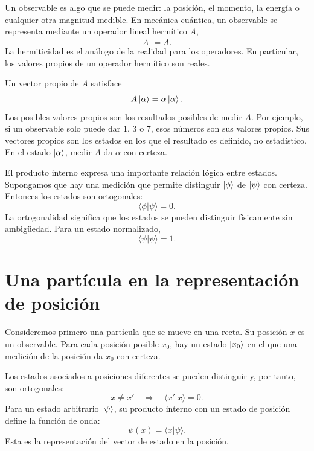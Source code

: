 Un observable es algo que se puede medir: la posición, el momento, la energía o cualquier otra magnitud medible. En mecánica cuántica, un observable se representa mediante un operador lineal hermítico \(A\),
\begin{equation}
A^\dagger=A.
\end{equation}
La hermiticidad es el análogo de la realidad para los operadores. En particular, los valores propios de un operador hermítico son reales.

Un vector propio de \(A\) satisface
\begin{equation}
A\left\lvert\alpha\right\rangle=\alpha\left\lvert\alpha\right\rangle.
\end{equation}
Los posibles valores propios son los resultados posibles de medir \(A\). Por ejemplo, si un observable solo puede dar \(1\), \(3\) o \(7\), esos números son sus valores propios. Sus vectores propios son los estados en los que el resultado es definido, no estadístico. En el estado \(\left\lvert\alpha\right\rangle\), medir \(A\) da \(\alpha\) con certeza.

El producto interno expresa una importante relación lógica entre estados. Supongamos que hay una medición que permite distinguir \(\left\lvert\phi\right\rangle\) de \(\left\lvert\psi\right\rangle\) con certeza. Entonces los estados son ortogonales:
\begin{equation}
\langle\phi|\psi\rangle=0.
\end{equation}
La ortogonalidad significa que los estados se pueden distinguir físicamente sin ambigüedad. Para un estado normalizado,
\begin{equation}
\langle\psi|\psi\rangle=1.
\end{equation}

\section{Una partícula en la representación de posición}

Consideremos primero una partícula que se mueve en una recta. Su posición \(x\) es un observable. Para cada posición posible \(x_0\), hay un estado \(\left\lvert x_0\right\rangle\) en el que una medición de la posición da \(x_0\) con certeza.

Los estados asociados a posiciones diferentes se pueden distinguir y, por tanto, son ortogonales:
\begin{equation}
x\neq x'
\quad\Longrightarrow\quad
\langle x'|x\rangle=0.
\end{equation}
Para un estado arbitrario \(\left\lvert\psi\right\rangle\), su producto interno con un estado de posición define la función de onda:
\begin{equation}
\psi(x)=\langle x|\psi\rangle.
\end{equation}
Esta es la representación del vector de estado en la posición.

